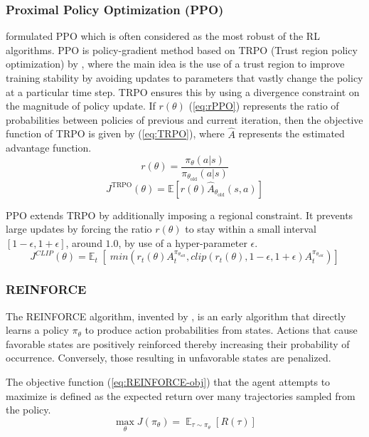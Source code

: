 \documentclass[a4paper, 12pt]{article}
\begin{document}
\subsubsection*{Proximal Policy Optimization (PPO)} 
\cite{PPO-schulman2017} formulated PPO which is often considered as the most robust of the RL algorithms. PPO is policy-gradient method based on TRPO (Trust region policy optimization) by \cite{TRPO-schulman2015}, where the main idea is the use of a trust region to improve training stability by avoiding updates to parameters that vastly change the policy at a particular time step. TRPO ensures this by using a divergence constraint on the magnitude of policy update. If $r(\theta)$ (\ref{eq:rPPO}) represents the ratio of probabilities between policies of previous and current iteration, then the objective function of TRPO is given by (\ref{eq:TRPO}), where $\hat{A}$ represents the estimated advantage function.
\begin{equation}\label{eq:rPPO}
	r(\theta) = \frac{\pi_\theta(a \vert s)}{\pi_{\theta_\text{old}}(a \vert s)}
\end{equation}
\begin{equation}\label{eq:TRPO}
	J^\text{TRPO} (\theta) = \mathbb{E} [ r(\theta) \hat{A}_{\theta_\text{old}}(s, a) ]
\end{equation}

PPO extends TRPO by additionally imposing a regional constraint. It prevents large updates by forcing the ratio $r(\theta)$ to stay within a small interval $[1-\epsilon, 1+\epsilon]$, around $1.0$, by use of a hyper-parameter $\epsilon$.
\begin{equation}
	J^{CLIP} (\theta) = \mathbb{E}_t \; [ \; min (r_t(\theta) A^{\pi_{\theta_{old}}}_t, clip(r_t(\theta), 1-\epsilon, 1+\epsilon) A^{\pi_{\theta_{old}}}_t)]
	\label{eq:PPO}
\end{equation}

\subsubsection*{REINFORCE} 
The REINFORCE algorithm, invented by \cite{REINFORCE-williams1992}, is an early algorithm that directly learns a policy $\pi_\theta$ to produce action probabilities from states. Actions that cause favorable states are positively reinforced thereby increasing their probability of occurrence. Conversely, those resulting in unfavorable states are penalized.

The objective function (\ref{eq:REINFORCE-obj}) that the agent attempts to maximize is defined as the expected return over many trajectories sampled from the policy.
\begin{equation}\label{eq:REINFORCE-obj}
	\max_{\theta} J(\pi_{\theta}) = \mathop{\mathbb{E}}_{\tau \sim \pi_\theta} [R(\tau)]
\end{equation}
\end{document}
